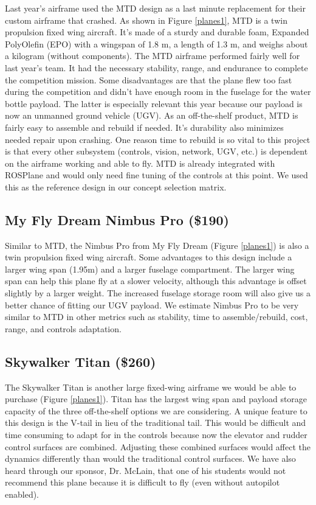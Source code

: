 \documentclass[]{auvsi_doc}
\begin{document}
Last year's airframe used the MTD design as a last minute replacement for their custom airframe that crashed. As shown in Figure \ref{planes1}, MTD is a twin propulsion fixed wing aircraft. It's made of a sturdy and durable foam, Expanded PolyOlefin (EPO) with a wingspan of 1.8  m, a length of 1.3 m, and weighs about a kilogram (without components). The MTD airframe performed fairly well for last year's team. It had the necessary stability, range, and endurance to complete the competition mission. Some disadvantages are that the plane flew too fast during the competition and didn't have enough room in the fuselage for the water bottle payload. The latter is especially relevant this year because our payload is now an unmanned ground vehicle (UGV). As an off-the-shelf product, MTD is fairly easy to assemble and rebuild if needed. It's durability also minimizes needed repair upon crashing. One reason time to rebuild is so vital to this project is that every other subsystem (controls, vision, network, UGV, etc.) is dependent on the airframe working and able to fly. MTD is already integrated with ROSPlane and would only need fine tuning of the controls at this point. We used this as the reference design in our concept selection matrix.

\subsection{My Fly Dream Nimbus Pro (\$190)}

Similar to MTD, the Nimbus Pro from My Fly Dream (Figure \ref{planes1}) is also a twin propulsion fixed wing aircraft. Some advantages to this design include a larger wing span (1.95m) and a larger fuselage compartment. The larger wing span can help this plane fly at a slower velocity, although this advantage is offset slightly by a larger weight. The increased fuselage storage room will also give us a better chance of fitting our UGV payload. We estimate Nimbus Pro to be very similar to MTD in other metrics such as stability, time to assemble/rebuild, cost, range, and controls adaptation.

\subsection{Skywalker Titan (\$260)}

The Skywalker Titan is another large fixed-wing airframe we would be able to purchase (Figure \ref{planes1}). Titan has the largest wing span and payload storage capacity of the three off-the-shelf options we are considering. A unique feature to this design is the V-tail in lieu of the traditional tail. This would be difficult and time consuming to adapt for in the controls because now the elevator and rudder control surfaces are combined. Adjusting these combined surfaces would affect the dynamics differently than would the traditional control surfaces. We have also heard through our sponsor, Dr. McLain, that one of his students would not recommend this plane because it is difficult to fly (even without autopilot enabled).
\end{document}
